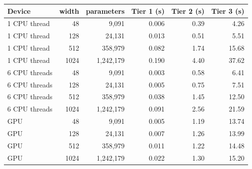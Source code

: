 \begin{tabular}{@{}lrrrrr@{}}
\toprule
Device & width & parameters & Tier 1 (s) & Tier 2 (s) & Tier 3 (s) \\
\midrule
1 CPU thread & 48 & 9,091 & 0.006 & 0.39 & 4.26 \\
1 CPU thread & 128 & 24,131 & 0.013 & 0.51 & 5.51 \\
1 CPU thread & 512 & 358,979 & 0.082 & 1.74 & 15.68 \\
1 CPU thread & 1024 & 1,242,179 & 0.190 & 4.40 & 37.62 \\
6 CPU threads & 48 & 9,091 & 0.003 & 0.58 & 6.41 \\
6 CPU threads & 128 & 24,131 & 0.005 & 0.75 & 7.51 \\
6 CPU threads & 512 & 358,979 & 0.038 & 1.45 & 12.50 \\
6 CPU threads & 1024 & 1,242,179 & 0.091 & 2.56 & 21.59 \\
GPU & 48 & 9,091 & 0.005 & 1.19 & 13.74 \\
GPU & 128 & 24,131 & 0.007 & 1.26 & 13.99 \\
GPU & 512 & 358,979 & 0.011 & 1.22 & 14.48 \\
GPU & 1024 & 1,242,179 & 0.022 & 1.30 & 15.20 \\
\bottomrule
\end{tabular}